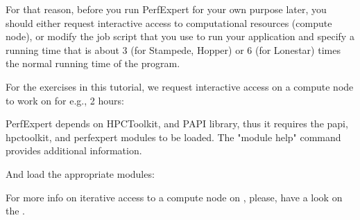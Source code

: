 For that reason, before you run PerfExpert for your own purpose later, you should either request interactive access to computational resources (compute node), or modify the job script that you use to run your application and specify a running time that is about 3 (for Stampede, Hopper) or 6 (for Lonestar) times the normal running time of the program.

For the exercises in this tutorial, we request interactive access on a compute node to work on for e.g., 2 hours:

\iftacc
\begin{prompt}
\end{prompt}
\fi
\ifvsc
\begin{prompt}
\end{prompt}
\fi

PerfExpert depends on HPCToolkit, and PAPI library, thus it requires the papi, hpctoolkit, and perfexpert modules to be loaded. The "module help" command provides additional information.

And load the appropriate modules:
\iftacc
\begin{prompt}
\end{prompt}
\fi
\ifvsc
\begin{prompt}
\end{prompt}
\fi
\ifbrussel
\begin{prompt}
\end{prompt}
\fi

For more info on iterative access to a compute node on \hpcname, please, have a look on the \hpcuserguide.

